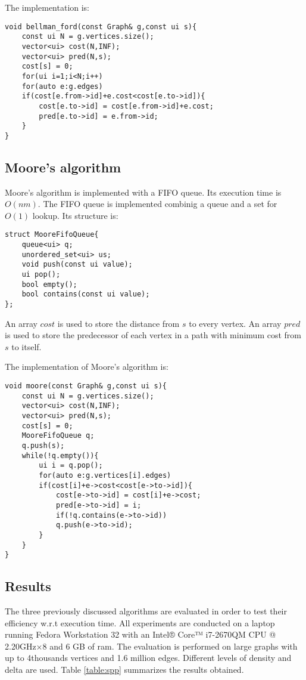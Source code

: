 The implementation is:
\begin{verbatim}
void bellman_ford(const Graph& g,const ui s){
	const ui N = g.vertices.size();
	vector<ui> cost(N,INF);
	vector<ui> pred(N,s);
	cost[s] = 0;
	for(ui i=1;i<N;i++)
	for(auto e:g.edges)
	if(cost[e.from->id]+e.cost<cost[e.to->id]){
		cost[e.to->id] = cost[e.from->id]+e.cost;
		pred[e.to->id] = e.from->id;
	}
}
\end{verbatim}

\subsection{Moore's algorithm}
Moore's algorithm is implemented with a FIFO queue. Its execution time is $O(nm)$.
The FIFO queue is implemented combinig a queue and a set for $O(1)$ lookup. Its structure is:
\begin{verbatim}
struct MooreFifoQueue{
	queue<ui> q;
	unordered_set<ui> us;
	void push(const ui value);
	ui pop();
	bool empty();
	bool contains(const ui value);
};
\end{verbatim}

An array $cost$ is used to store the distance from $s$ to every vertex.
An array $pred$ is used to store the predecessor of each vertex in a path with minimum cost from $s$ to itself.

The implementation of Moore's algorithm is:
\begin{verbatim}
void moore(const Graph& g,const ui s){
	const ui N = g.vertices.size();
	vector<ui> cost(N,INF);
	vector<ui> pred(N,s);
	cost[s] = 0;
	MooreFifoQueue q;
	q.push(s);
	while(!q.empty()){
		ui i = q.pop();
		for(auto e:g.vertices[i].edges)
		if(cost[i]+e->cost<cost[e->to->id]){
			cost[e->to->id] = cost[i]+e->cost;
			pred[e->to->id] = i;
			if(!q.contains(e->to->id))
			q.push(e->to->id);
		}
	}
}
\end{verbatim}

\subsection{Results}
The three previously discussed algorithms are evaluated in order to test their efficiency w.r.t execution time. All experiments are conducted on
a laptop running Fedora Workstation 32 with an Intel® Core™ i7-2670QM CPU @ 2.20GHz×8 and 6 GB of ram.
The evaluation is performed on large graphs with up to 4thousands vertices and 1.6 million edges. Different levels of density and delta are used.
Table \ref{table:spp} summarizes the results obtained.


